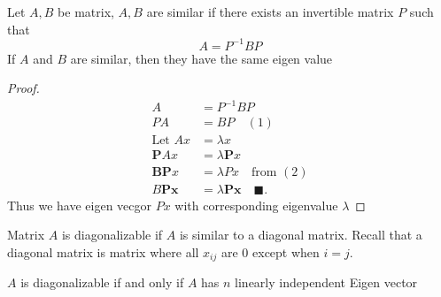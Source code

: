 \documentclass[12pt]{article}
\begin{document}
\begin{definition}
 	Let $A, B$ be matrix, $A,B$ are similar if there exists an invertible matrix $P$ such that
 	\[
 		A=P^{-1}BP
 	\]
 	If $A$ and $B$ are similar, then they have the same eigen value
\end{definition}
\begin{proof}
	\begin{align*}
	A&=P^{-1}BP\\
	PA&=BP \quad(1)\\
	\text{Let } Ax &=\lambda x\\
	\pmb{P}Ax &= \lambda \pmb{P}x\\
	\pmb{BP}x &= \lambda Px\quad \text{from } (2)\\
	B\pmb{Px} &= \lambda \pmb{Px} \quad \blacksquare.
	\end{align*}
	Thus we have eigen vecgor $Px$ with corresponding eigenvalue $\lambda$
\end{proof}
\begin{definition}
	Matrix $A$ is diagonalizable if $A$ is similar to a diagonal matrix. Recall that a diagonal matrix is matrix where all $x_{ij}$ are 0 except when $i=j$.
\end{definition}
\begin{theorem}
	$A$ is diagonalizable if and only if $A$ has $n$ linearly independent Eigen vector
\end{theorem}
\end{document}
